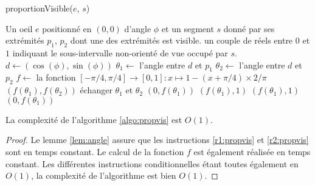 \begin{algorithm}
  \caption{proportionVisible($e$, $s$)}
  \begin{algorithmic}[1] \label{algo:propvis}
    \REQUIRE Un oeil $e$ positionné en $(0, 0)$ d'angle $\phi$ et un segment $s$
    donné par ses extrémités $p_1$, $p_2$ dont une des extrémités est visible.
    \ENSURE un couple de réels entre $0$ et $1$  indiquant le sous-intervalle
    non-orienté de vue occupé par $s$.
    \STATE $d\leftarrow (\cos(\phi), \sin(\phi))$
    \STATE $\theta_1\leftarrow$ l'angle entre $d$ et $p_1$ \label{r1:propvis}
    \STATE $\theta_2\leftarrow$ l'angle entre $d$ et $p_2$ \label{r2:propvis}
    \STATE $f\leftarrow$ la fonction $
    [-\pi/4, \pi/4]\to [0, 1]: x\mapsto 1 - (x+\pi/4) \times 2/\pi$
    \IF{$\theta_1\in[-\pi/4, \pi/4]\land \theta_2\in[-\pi/4, \pi/4]$}
    \RETURN $(f(\theta_1), f(\theta_2))$
    \ELSE
    \IF{$\theta_1\notin[-\pi/4, \pi/4]$}
    \STATE échanger $\theta_1$ et $\theta_2$
    \ENDIF
    \RETURN $(0, f(\theta_1))$
    \ELSE
    \RETURN $(f(\theta_1), 1)$
    \ENDIF
    \RETURN $(f(\theta_1), 1)$
    \ELSE
    \RETURN $(0, f(\theta_1))$
    \ENDIF
    \ENDIF
    \ENDIF
  \end{algorithmic}
\end{algorithm}

\begin{prop}
  La complexité de l'algorithme \ref{algo:propvis} est $O(1)$.
\end{prop}
\begin{proof}
  Le lemme \ref{lem:angle} assure que les instructions \ref{r1:propvis} et
  \ref{r2:propvis} sont en temps constant. Le calcul de la fonction $f$
  est également réalisée en temps constant. Les différentes instructions
  conditionnelles étant toutes également en $O(1)$, la complexité de
  l'algorithme est bien $O(1)$.
\end{proof}



